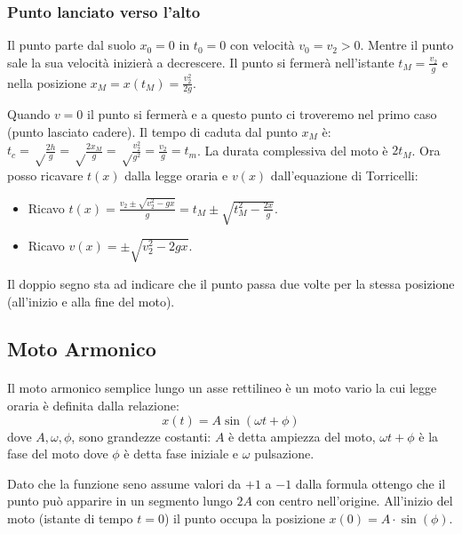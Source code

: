 \documentclass[class=book, crop=false, oneside, 12pt]{standalone}
\begin{document}
\subsubsection{Punto lanciato verso l'alto}

Il punto parte dal suolo \(x_0 = 0\) in \(t_0 = 0\) con velocità
\(v_ 0 =v_2 > 0\). Mentre il punto sale la sua velocità inizierà a
decrescere. Il punto si fermerà nell'istante \(t_M = \frac {v_2} g\) e
nella posizione \(x_M = x(t_M) = \frac {v_2^2} {2g}\).

Quando \(v = 0\) il punto si fermerà e a questo punto ci troveremo nel
primo caso (punto lasciato cadere). Il tempo di caduta dal punto \(x_M\)
è:
\(t_c = \sqrt \frac {2h}{g} = \sqrt \frac {2 x_M}{g} = \sqrt \frac {v_2^2}{g^2} = \frac {v_2} {g} = t_m\).
La durata complessiva del moto è \(2t_M\). Ora posso ricavare \(t(x)\)
dalla legge oraria e \(v(x)\) dall'equazione di Torricelli:

\begin{itemize}
\item
  Ricavo
  \(t(x) = \frac {v_2 \pm {\sqrt{v_2^2 -gx}}}{g} = t_M \pm \sqrt {t_M^2 - \frac {2x}{g}}\).
\item
  Ricavo \(v(x) = \pm \sqrt {v_2^2 -2gx}\).
\end{itemize}

Il doppio segno sta ad indicare che il punto passa due volte per la
stessa posizione (all'inizio e alla fine del moto).

\subsection{Moto Armonico}
\paragraph{}
Il moto armonico semplice lungo un asse rettilineo è un moto vario la cui legge oraria è definita dalla relazione:
\begin{equation}
  x(t) = A \sin (\omega t + \phi)
\end{equation}
dove \(A,\omega, \phi \), sono grandezze costanti: \(A\) è detta ampiezza del moto, \(\omega t + \phi \) è la fase del moto dove
\(\phi \) è detta fase iniziale e \(\omega \) pulsazione.

Dato che la funzione seno assume valori da \(+1\) a \(-1\) dalla formula ottengo che il punto può apparire in un segmento lungo \(2A\) con centro nell'origine.
All'inizio del moto (istante di tempo \(t = 0\)) il punto occupa la posizione \(x(0) = A \cdot \sin (\phi) \).
\end{document}
